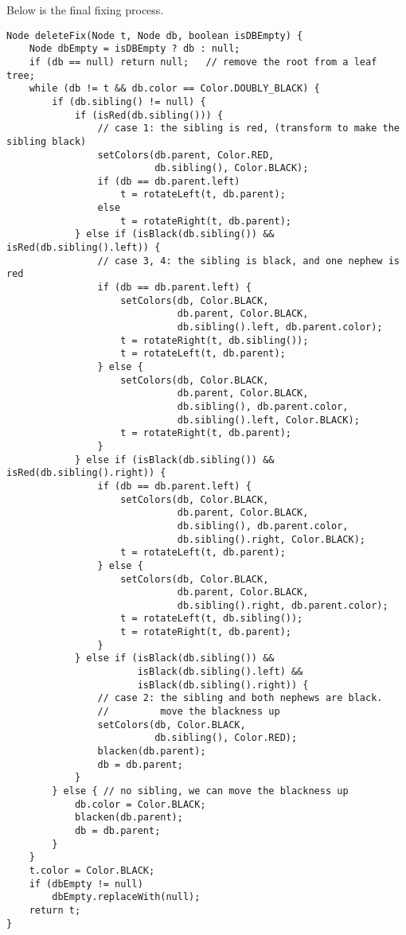 \documentclass[UTF8]{article}
\begin{document}
Below is the final fixing process.

\begin{lstlisting}
Node deleteFix(Node t, Node db, boolean isDBEmpty) {
    Node dbEmpty = isDBEmpty ? db : null;
    if (db == null) return null;   // remove the root from a leaf tree;
    while (db != t && db.color == Color.DOUBLY_BLACK) {
        if (db.sibling() != null) {
            if (isRed(db.sibling())) {
                // case 1: the sibling is red, (transform to make the sibling black)
                setColors(db.parent, Color.RED,
                          db.sibling(), Color.BLACK);
                if (db == db.parent.left)
                    t = rotateLeft(t, db.parent);
                else
                    t = rotateRight(t, db.parent);
            } else if (isBlack(db.sibling()) && isRed(db.sibling().left)) {
                // case 3, 4: the sibling is black, and one nephew is red
                if (db == db.parent.left) {
                    setColors(db, Color.BLACK,
                              db.parent, Color.BLACK,
                              db.sibling().left, db.parent.color);
                    t = rotateRight(t, db.sibling());
                    t = rotateLeft(t, db.parent);
                } else {
                    setColors(db, Color.BLACK,
                              db.parent, Color.BLACK,
                              db.sibling(), db.parent.color,
                              db.sibling().left, Color.BLACK);
                    t = rotateRight(t, db.parent);
                }
            } else if (isBlack(db.sibling()) && isRed(db.sibling().right)) {
                if (db == db.parent.left) {
                    setColors(db, Color.BLACK,
                              db.parent, Color.BLACK,
                              db.sibling(), db.parent.color,
                              db.sibling().right, Color.BLACK);
                    t = rotateLeft(t, db.parent);
                } else {
                    setColors(db, Color.BLACK,
                              db.parent, Color.BLACK,
                              db.sibling().right, db.parent.color);
                    t = rotateLeft(t, db.sibling());
                    t = rotateRight(t, db.parent);
                }
            } else if (isBlack(db.sibling()) &&
                       isBlack(db.sibling().left) &&
                       isBlack(db.sibling().right)) {
                // case 2: the sibling and both nephews are black.
                //         move the blackness up
                setColors(db, Color.BLACK,
                          db.sibling(), Color.RED);
                blacken(db.parent);
                db = db.parent;
            }
        } else { // no sibling, we can move the blackness up
            db.color = Color.BLACK;
            blacken(db.parent);
            db = db.parent;
        }
    }
    t.color = Color.BLACK;
    if (dbEmpty != null)
        dbEmpty.replaceWith(null);
    return t;
}
\end{lstlisting}
\end{document}
